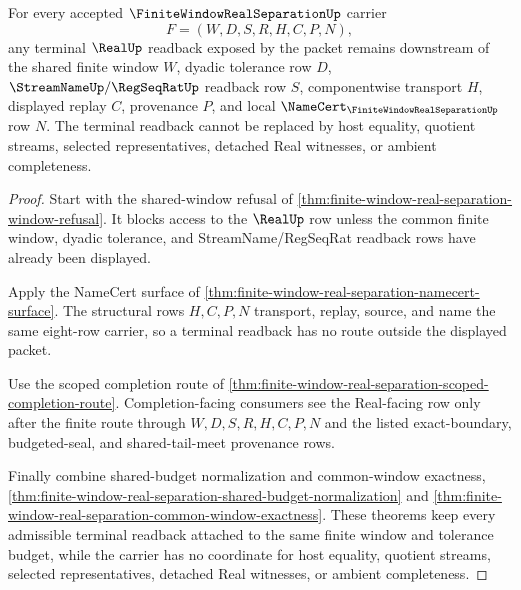 \begin{theorem}
\label{thm:finitewindowrealseparation-terminal-readback-exclusion}
For every accepted $\FiniteWindowRealSeparationUp$ carrier
$$
F=(W,D,S,R,H,C,P,N),
$$
any terminal $\RealUp$ readback exposed by the packet remains downstream of the shared finite window $W$, dyadic tolerance row $D$, $\StreamNameUp/\RegSeqRatUp$ readback row $S$, componentwise transport $H$, displayed replay $C$, provenance $P$, and local $\NameCert_{\FiniteWindowRealSeparationUp}$ row $N$. The terminal readback cannot be replaced by host equality, quotient streams, selected representatives, detached Real witnesses, or ambient completeness.
\end{theorem}
\begin{proof}
Start with the shared-window refusal of \autoref{thm:finite-window-real-separation-window-refusal}. It blocks access to the $\RealUp$ row unless the common finite window, dyadic tolerance, and StreamName/RegSeqRat readback rows have already been displayed.

Apply the NameCert surface of \autoref{thm:finite-window-real-separation-namecert-surface}. The structural rows $H,C,P,N$ transport, replay, source, and name the same eight-row carrier, so a terminal readback has no route outside the displayed packet.

Use the scoped completion route of \autoref{thm:finite-window-real-separation-scoped-completion-route}. Completion-facing consumers see the Real-facing row only after the finite route through $W,D,S,R,H,C,P,N$ and the listed exact-boundary, budgeted-seal, and shared-tail-meet provenance rows.

Finally combine shared-budget normalization and common-window exactness, \autoref{thm:finite-window-real-separation-shared-budget-normalization} and \autoref{thm:finite-window-real-separation-common-window-exactness}. These theorems keep every admissible terminal readback attached to the same finite window and tolerance budget, while the carrier has no coordinate for host equality, quotient streams, selected representatives, detached Real witnesses, or ambient completeness.
\end{proof}

